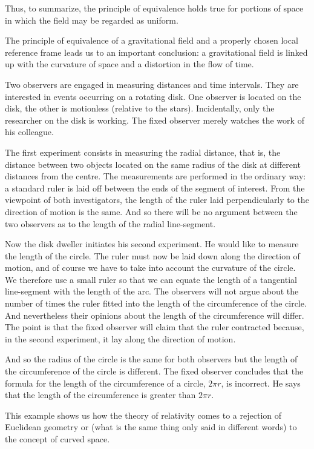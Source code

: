 Thus, to summarize, the principle of equivalence holds true for portions of space in which the field may be re­garded as uniform.

The principle of equivalence of a gravitational field and a properly chosen local reference frame leads us to an important conclusion: a gravitational field is linked up with the curvature of space and a distortion in the flow of time.

Two observers are engaged in measuring distances and time intervals. They are interested in events occurring on a rotating disk. One observer is located on the disk, the other is motionless (relative to the stars). Incidentally, only the researcher on the disk is working. The fixed observer merely watches the work of his colleague.

The first experiment consists in measuring the radial distance, that is, the distance between two objects located on the same radius of the disk at different distances from the centre. The measurements are performed in the ordi­nary way: a standard ruler is laid off between the ends of the segment of interest. From the viewpoint of both in­vestigators, the length of the ruler laid perpendicularly to the direction of motion is the same. And so there will be no argument between the two observers as to the length of the radial line-segment.

Now the disk dweller initiates his second experiment. He would like to measure the length of the circle. The ruler must now be laid down along the direction of mo­tion, and of course we have to take into account the curvature of the circle. We therefore use a small ruler so that we can equate the length of a tangential line-segment with the length of the arc. The observers will not argue about the number of times the ruler fitted into the length of the circumference of the circle. And never­theless their opinions about the length of the circum­ference will differ. The point is that the fixed observer will claim that the ruler contracted because, in the second experiment, it lay along the direction of motion.

And so the radius of the circle is the same for both observers but the length of the circumference of the circle is different. The fixed observer concludes that the formula for the length of the circumference of a circle, $2\pi r$, is incorrect. He says that the length of the circumference is greater than $2 \pi r$.

This example shows us how the theory of relativity comes to a rejection of Euclidean geometry or (what is the same thing only said in different words) to the concept of curved space.

